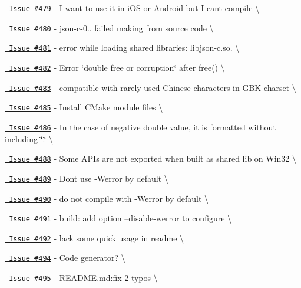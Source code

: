 \begin{DoxyItemize}
\item \href{https://github.com/json-c/json-c/issues/479}{\texttt{ Issue \#479}} -\/ I want to use it in i\+OS or Android but I can\textquotesingle{}t compile \textbackslash{}
\item \href{https://github.com/json-c/json-c/issues/480}{\texttt{ Issue \#480}} -\/ json-\/c-\/0.. failed making from source code \textbackslash{}
\item \href{https://github.com/json-c/json-c/issues/481}{\texttt{ Issue \#481}} -\/ error while loading shared libraries\+: libjson-\/c.\+so. \textbackslash{}
\item \href{https://github.com/json-c/json-c/issues/482}{\texttt{ Issue \#482}} -\/ Error \char`\"{}double free or corruption\char`\"{} after free() \textbackslash{}
\item \href{https://github.com/json-c/json-c/issues/483}{\texttt{ Issue \#483}} -\/ compatible with rarely-\/used Chinese characters in GBK charset \textbackslash{}
\item \href{https://github.com/json-c/json-c/issues/485}{\texttt{ Issue \#485}} -\/ Install CMake module files \textbackslash{}
\item \href{https://github.com/json-c/json-c/issues/486}{\texttt{ Issue \#486}} -\/ In the case of negative double value, it is formatted without including \char`\"{}.\char`\"{} \textbackslash{}
\item \href{https://github.com/json-c/json-c/issues/488}{\texttt{ Issue \#488}} -\/ Some APIs are not exported when built as shared lib on Win32 \textbackslash{}
\item \href{https://github.com/json-c/json-c/issues/489}{\texttt{ Issue \#489}} -\/ Don\textquotesingle{}t use -\/Werror by default \textbackslash{}
\item \href{https://github.com/json-c/json-c/issues/490}{\texttt{ Issue \#490}} -\/ do not compile with -\/Werror by default \textbackslash{}
\item \href{https://github.com/json-c/json-c/issues/491}{\texttt{ Issue \#491}} -\/ build\+: add option --disable-\/werror to configure \textbackslash{}
\item \href{https://github.com/json-c/json-c/issues/492}{\texttt{ Issue \#492}} -\/ lack some quick usage in readme \textbackslash{}
\item \href{https://github.com/json-c/json-c/issues/494}{\texttt{ Issue \#494}} -\/ Code generator? \textbackslash{}
\item \href{https://github.com/json-c/json-c/issues/495}{\texttt{ Issue \#495}} -\/ README.\+md\+:fix 2 typos \textbackslash{}

\end{DoxyItemize}
